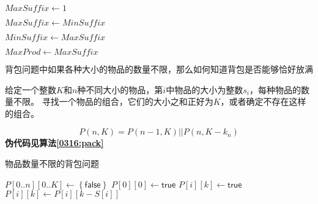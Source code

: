 \begin{questions}
\begin{algorithm}[!htp]
\begin{algorithmic}[1]
            \State $MaxSuffix \gets 1$
            \EndIf

            \State $MaxSuffix \gets MinSuffix$
            \EndIf

            \State $MinSuffix \gets MaxSuffix$
            \EndIf

            \State $MaxProd \gets MaxSuffix$
            \EndIf
            \EndFor
        \end{algorithmic}
    \end{algorithm}

    \question 背包问题中如果各种大小的物品的数量不限，那么如何知道背包是否能够恰好放满

    {\kaishu
    给定一个整数$K$和$n$种不同大小的物品，第$i$中物品的大小为整数$s_i$，每种物品的数量不限。
    寻找一个物品的组合，它们的大小之和正好为$K$，或者确定不存在这样的组合。
    }

    \begin{solution}
        \[
            P(n,K) = P(n - 1, K) || P(n, K - k_n)
        \]
        \textbf{伪代码见算法\ref{0316:pack}}
    \end{solution}




    \begin{algorithm}[!htp]
        \caption{物品数量不限的背包问题}\label{0316:pack}
        \begin{algorithmic}[1]
            \State $P[0..n][0..K] \gets \left\{ \mathsf{false} \right\}$
            \State $P[0][0] \gets \mathsf{true}$
            \State $P[i][k] \gets \mathsf{true}$
            \State $P[i][k] \gets P[i][k-S[i]]$
            \EndIf
            \EndFor
            \EndFor
        \end{algorithmic}
    \end{algorithm}

\end{questions}
